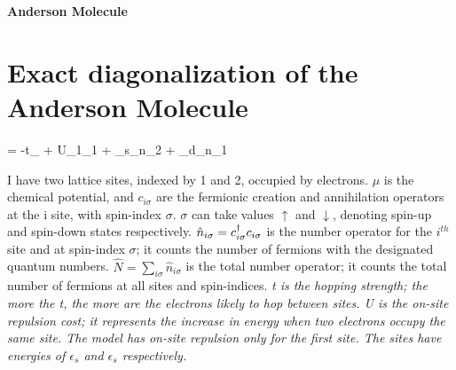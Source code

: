 \documentclass{article}
\begin{document}
\begin{titlepage}

\begin{center}
\bf{\Large{Anderson Molecule}}\\
\end{center}

\end{titlepage}

\section{Exact diagonalization of the Anderson Molecule}

\beq
\ham = -t\sum_\sigma{} + U_{1\uparrow}_{1\downarrow} + \epsilon_s\sum_\sigma\hat n_{2\sigma} + \epsilon_d\sum_\sigma\hat n_{1\sigma}
\eeq

I have two lattice sites, indexed by 1 and 2, occupied by electrons. \(\mu\) is the chemical potential,  and \(c_{i\sigma}\) are the fermionic creation and annihilation operators at the i site, with spin-index \(\sigma\). \(\sigma\) can take values \(\uparrow\) and \(\downarrow\), denoting spin-up and spin-down states respectively. \(\hat{n}_{i\sigma}=c_{{i}{\sigma}}^\dagger c_{{i}{\sigma}}\) is the number operator for the \(i^{th}\) site and at spin-index \(\sigma\); it counts the number of fermions with the designated quantum numbers. \(\hat{N}= \sum_{i\sigma}\hat{n}_{i\sigma}\) is the total number operator; it counts the total number of fermions at all sites and spin-indices. \it t is the hopping strength; the more the t, the more are the electrons likely to hop between sites. \it U is the on-site repulsion cost; it represents the increase in energy when two electrons occupy the same site. The model has on-site repulsion only for the first site. The sites have energies of \(\epsilon_s\) and \(\epsilon_s\) respectively.
\end{document}
